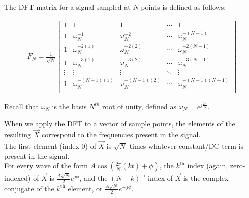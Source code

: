 

The DFT matrix for a signal sampled at $N$ points is defined as follows:

\begin{align*}
F_N =
\frac{1}{\sqrt{N}} \begin{bmatrix}
1 & 1 & 1 & \cdots & 1 \\
1 & \omega_N^{-1} & \omega_N^{-2} & \cdots & \omega_N^{-(N-1)} \\
1 & \omega_N^{-2(1)} & \omega_N^{-2(2)} & \cdots & \omega_N^{-2(N-1)} \\
1 & \omega_N^{-3(1)} & \omega_N^{-3(2)} & \cdots & \omega_N^{-3(N-1)} \\
\vdots & \vdots & \vdots  & \ddots & \vdots \\
1 & \omega_N^{-(N-1)(1)} & \omega_N^{-(N-1)(2)} & \cdots & \omega_N^{-(N-1)(N-1)} \\
\end{bmatrix}
\end{align*}

Recall that $\omega_N$ is the basis $N^{th}$ root of unity, defined as $\omega_N = e^{j\frac{2\pi}{N}}$.

\vspace{0.5em}
When we apply the DFT to a vector of sample points, the elements of the resulting $\vec{X}$ correspond to the frequencies present in the signal. \\
The first element (index 0) of $\vec{X}$ is $\sqrt{N}$ times whatever constant/DC term is present in the signal. \\
For every wave of the form $A\cos(\frac{2\pi}{N}(kt) + \phi)$, the $k^{\text{th}}$ index (again, zero-indexed) of $\vec{X}$ is $\frac{A\sqrt{N}}{2}e^{j\phi}$,
and the $(N - k)^{\text{th}}$ index of $\vec{X}$ is the complex conjugate of the $k^{\text{th}}$ element, or $\frac{A\sqrt{N}}{2}e^{-j\phi}$.

